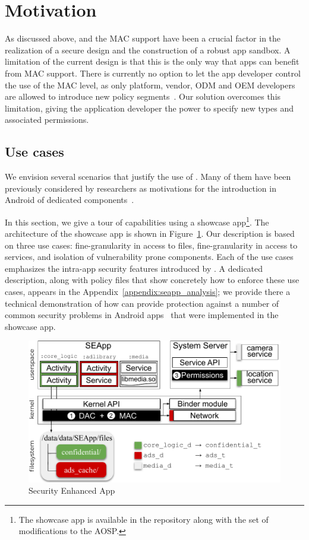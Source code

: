 \section{Motivation}\label{sect:seapp_motiv}

As discussed above, \sel and the MAC support have been a crucial
factor in the realization of a secure design and the construction of a
robust app sandbox.  A limitation of the current design is that this
is the only way that apps can benefit from MAC support.  There is
currently no option to let the app developer control the use of the
MAC level, as only platform, vendor, ODM and OEM developers are
allowed to introduce new policy
segments~\cite{seapp_sea_compatibility}.  Our solution overcomes this
limitation, giving the application developer the power to specify new
\sel types and associated permissions.

\subsection{Use cases}\label{sect:seapp_use-cases}
We envision several scenarios that justify the use of \pap.  Many of
them have been previously considered by researchers as motivations for
the introduction in Android of dedicated
components~\cite{seapp_10.1145/2976749.2978333,
  seapp_10.1145/3292006.3300027, seapp_10.1145/3133956.3134064}.

In this section, we give a tour of \pap capabilities using a showcase
app\footnote{The showcase app is available in the \pap repository
  along with the set of modifications to the AOSP.}.  The architecture
of the showcase app is shown in Figure~\ref{fig:seapp_showcase}. Our
description is based on three use cases: fine-granularity in access to
files, fine-granularity in access to services, and isolation of
vulnerability prone components.  Each of the use cases emphasizes the
intra-app security features introduced by \pap.  A dedicated
description, along with policy files that show concretely how to
enforce these use cases, appears in the
Appendix~\ref{appendix:seapp_analysis}; we provide there a technical
demonstration of how \pap can provide protection against a number of
common security problems in Android
apps~\cite{seapp_common_play_protect_vulnerabilites} that were
implemented in the showcase app.

\begin{figure}[h]
	\centering
	\includegraphics[width=0.8\columnwidth]{chapters/seapp/figs/seapp_showcase_app}
	\caption{\label{fig:seapp_showcase} Security Enhanced App}
\end{figure}

